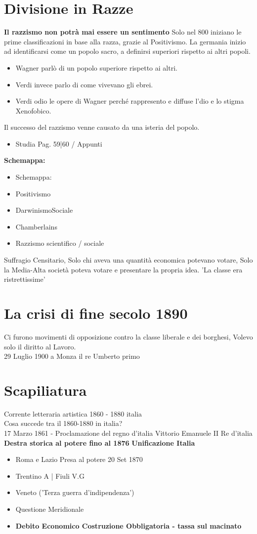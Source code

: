 \documentclass{article}
\begin{document}
\section{Divisione in Razze}
\textbf{Il razzismo non potrà mai essere un sentimento}
Solo nel 800 iniziano le prime classificazioni in base alla razza, grazie al Positivismo.
La germania inizio ad identificarsi come un popolo sacro, a definirsi superiori rispetto ai altri popoli.
\begin{itemize}
    \item Wagner parlò di un popolo superiore rispetto ai altri.
    \item Verdi invece parlo di come vivevano gli ebrei.
    \item Verdi odio le opere di Wagner perché rappresento e diffuse l'dio e lo stigma Xenofobico.
\end{itemize}
Il successo del razzismo venne causato da una isteria del popolo.
\begin{itemize}
    \item Studia Pag. 59|60 / Appunti
\end{itemize}
{\Large\textbf{Schemappa:}}
\begin{itemize}
\item Schemappa:
\item Positivismo
\item DarwinismoSociale
\item Chamberlains
\item Razzismo scientifico / sociale
\end{itemize}
Suffragio Censitario, Solo chi aveva una quantità economica potevano votare, Solo la Media-Alta società poteva
votare e presentare la propria idea. 'La classe era ristrettissime'
\section{La crisi di fine secolo 1890}
Ci furono movimenti di opposizione contro la classe liberale e dei borghesi, Volevo solo il diritto al Lavoro.\\
29 Luglio 1900 a Monza il re Umberto primo 

\section{Scapiliatura}
Corrente letteraria artistica 1860 - 1880 italia\\
Cosa succede tra il 1860-1880 in italia?\\
17 Marzo 1861 - Proclamazione del regno d'italia \textrightarrow Vittorio Emanuele II Re d'italia
\textbf{Destra storica al potere fino al 1876}
\textbf{Unificazione Italia}
\begin{itemize}
    \item Roma e Lazio \textrightarrow Presa al potere 20 Set 1870
    \item Trentino A | Fiuli V.G
    \item Veneto  ('Terza guerra d'indipendenza')
    \item Questione Meridionale
    \item \textbf{Debito Economico Costruzione Obbligatoria - tassa sul macinato}
\end{itemize}
\vspace{1cm}
\end{document}
